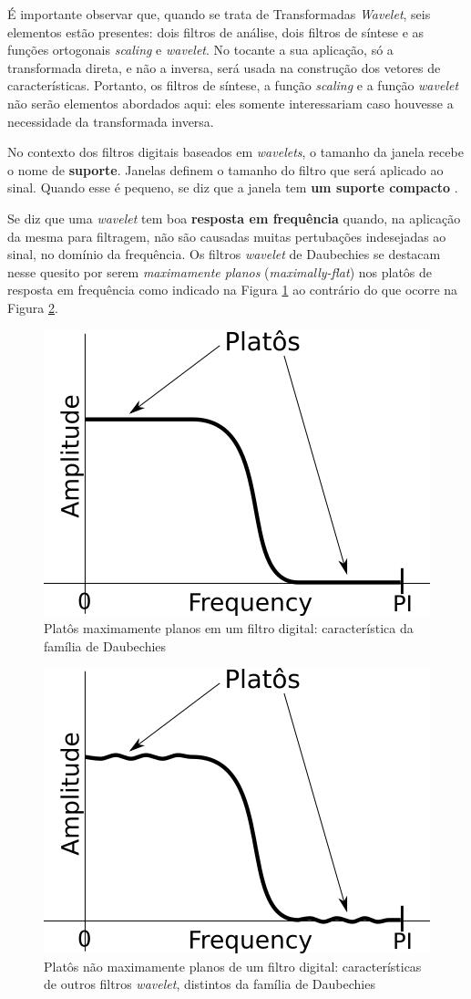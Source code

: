 			\par É importante observar que, quando se trata de Transformadas \textit{Wavelet}, seis elementos estão presentes: dois filtros de análise, dois filtros de síntese e as funções ortogonais \textit{scaling} e \textit{wavelet}. No tocante a sua aplicação, só a transformada direta, e não a inversa, será usada na construção dos vetores de características. Portanto, os filtros de síntese, a função \textit{scaling} e a função \textit{wavelet} não serão elementos abordados aqui: eles somente interessariam caso houvesse a necessidade da transformada inversa.

			\par No contexto dos filtros digitais baseados em \textit{wavelets}, o tamanho da janela recebe o nome de \textbf{suporte}. Janelas definem o tamanho do filtro que será aplicado ao sinal. Quando esse é pequeno, se diz que a janela tem \textbf{um suporte compacto} \cite{robi2003}.
		
			\par Se diz que uma \textit{wavelet} tem boa \textbf{resposta em frequência} quando, na aplicação da mesma para filtragem, não são causadas muitas pertubações indesejadas ao sinal, no domínio da frequência. Os filtros \textit{wavelet} de Daubechies se destacam nesse quesito por serem \textit{maximamente planos} (\textit{maximally-flat}) nos platôs de resposta em frequência como indicado na Figura \ref{fig:daubechies} ao contrário do que ocorre na Figura \ref{fig:nomaximallyflat}.

			\begin{figure}[h]
				\centering
				\includegraphics[width=0.3\linewidth]{images/daubechies}
				\caption{Platôs maximamente planos em um filtro digital: característica da família de Daubechies}
				\label{fig:daubechies}
			\end{figure}

			\begin{figure}[h]
				\centering
				\includegraphics[width=0.3\linewidth]{images/noMaximallyFlat}
				\caption{Platôs não maximamente planos de um filtro digital: características de outros filtros \textit{wavelet}, distintos da família de Daubechies}
				\label{fig:nomaximallyflat}
			\end{figure}
		
